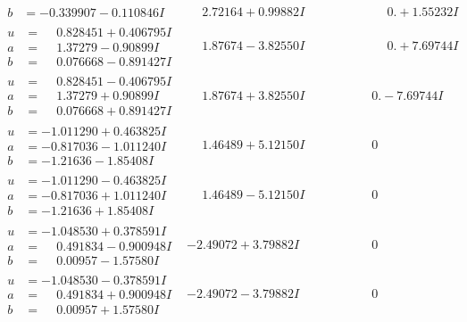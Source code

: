 \documentclass[1p]{elsarticle_modified}
\theoremstyle{definition}
\begin{document}
$$\begin{array}{c|c|c}
\begin{aligned}
b &= -0.339907 - 0.110846 I\end{aligned}
 & \phantom{-}2.72164 + 0.99882 I & \phantom{-0.000000 -}0. + 1.55232 I \\ \hline\begin{aligned}
u &= \phantom{-}0.828451 + 0.406795 I \\
a &= \phantom{-}1.37279 - 0.90899 I \\
b &= \phantom{-}0.076668 - 0.891427 I\end{aligned}
 & \phantom{-}1.87674 - 3.82550 I & \phantom{-0.000000 -}0. + 7.69744 I \\ \hline\begin{aligned}
u &= \phantom{-}0.828451 - 0.406795 I \\
a &= \phantom{-}1.37279 + 0.90899 I \\
b &= \phantom{-}0.076668 + 0.891427 I\end{aligned}
 & \phantom{-}1.87674 + 3.82550 I & \phantom{-0.000000 } 0. - 7.69744 I \\ \hline\begin{aligned}
u &= -1.011290 + 0.463825 I \\
a &= -0.817036 - 1.011240 I \\
b &= -1.21636 - 1.85408 I\end{aligned}
 & \phantom{-}1.46489 + 5.12150 I & \phantom{-0.000000 } 0 \\ \hline\begin{aligned}
u &= -1.011290 - 0.463825 I \\
a &= -0.817036 + 1.011240 I \\
b &= -1.21636 + 1.85408 I\end{aligned}
 & \phantom{-}1.46489 - 5.12150 I & \phantom{-0.000000 } 0 \\ \hline\begin{aligned}
u &= -1.048530 + 0.378591 I \\
a &= \phantom{-}0.491834 - 0.900948 I \\
b &= \phantom{-}0.00957 - 1.57580 I\end{aligned}
 & -2.49072 + 3.79882 I & \phantom{-0.000000 } 0 \\ \hline\begin{aligned}
u &= -1.048530 - 0.378591 I \\
a &= \phantom{-}0.491834 + 0.900948 I \\
b &= \phantom{-}0.00957 + 1.57580 I\end{aligned}
 & -2.49072 - 3.79882 I & \phantom{-0.000000 } 0 \\ \hline\begin{aligned}

\end{aligned}
\end{array}$$
\end{document}
